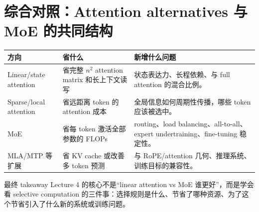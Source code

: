 \section{综合对照：Attention alternatives 与 MoE 的共同结构}
\begin{longtable}{p{}p{}p{}}
\toprule
\textbf{方向} & \textbf{省什么} & \textbf{新增什么问题} \\
\midrule
Linear/state attention & 省完整 \(n^2\) attention matrix 和长上下文读写 & 状态表达力、长程依赖、与 full attention 的混合比例。 \\
Sparse/local attention & 省远距离 token 的 attention 成本 & 全局信息如何周期性传播，哪些 token 应该被选中。 \\
MoE & 省每 token 激活全部参数的 FLOPs & routing、load balancing、all-to-all、expert undertraining、fine-tuning 稳定性。 \\
MLA/MTP 等扩展 & 省 KV cache 或改善多 token 预测 & 与 RoPE/attention 几何、推理系统、训练目标的兼容性。 \\
\bottomrule
\end{longtable}
\begin{importantbox}{最终 takeaway}
Lecture 4 的核心不是“linear attention vs MoE 谁更好”，而是学会看 selective computation 的三件事：选择规则是什么、节省了哪种资源、为了这个节省引入了什么新的系统或训练问题。
\end{importantbox}
